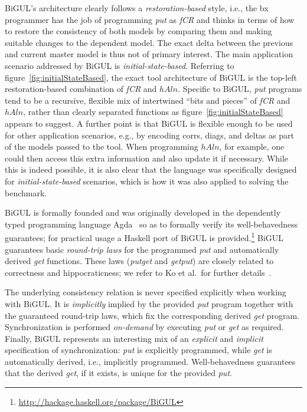 BiGUL's architecture clearly follows a \emph{restoration-based} style, i.e., the bx programmer has the job of programming \emph{put} as \emph{fCR}
and thinks in terms of how to restore the consistency of both models by comparing them and making suitable changes to the dependent model.
The exact delta between the previous and current master model is thus not of primary interest.
The main application scenario addressed by BiGUL is \emph{initial-state-based}.
Referring to figure~\ref{fig:initialStateBased}, the exact tool architecture of BiGUL is the top-left restoration-based combination of \emph{fCR} and $\mathit{hAln}$.
Specific to BiGUL, \emph{put} programs tend to be a recursive, flexible mix of intertwined ``bits and pieces'' of \emph{fCR} and $\mathit{hAln}$, rather than clearly separated functions as figure~\ref{fig:initialStateBased} appears to suggest.
A further point is that BiGUL is flexible enough to be used for other application scenarios, e.g., by encoding corrs, diags, and deltas as part of the models passed to the tool.
When programming $\mathit{hAln}$, for example, one could then access this extra information and also update it if necessary.
While this is indeed possible, it is also clear that the language was specifically designed for \emph{initial-state-based} scenarios, which is how it was also applied to solving the benchmark.

BiGUL is formally founded and was originally developed in the dependently typed programming language Agda~\cite{AFP08-Norell} so as to formally verify its well-behavedness guarantees; for practical usage a Haskell port of BiGUL is provided.\footnote{\url{http://hackage.haskell.org/package/BiGUL}}
BiGUL guarantees basic \emph{round-trip laws} for the programmed \emph{put} and automatically derived \emph{get} functions.
These laws (\emph{putget} and \emph{getput}) are closely related to correctness and hippocraticness; we refer to Ko et al.~for further details~\cite{PEPM2016-Ko}.

The underlying consistency relation is never specified explicitly when working with BiGUL.
It is \emph{implicitly} implied by the provided \emph{put} program together with the guaranteed round-trip laws, which fix the corresponding derived \emph{get} program.
Synchronization is performed \emph{on-demand} by executing \emph{put} or \emph{get} as required.
Finally, BiGUL represents an interesting mix of an \emph{explicit} and \emph{implicit} specification of synchronization:  \emph{put} is explicitly programmed, while \emph{get} is automatically derived, i.e., implicitly programmed.
Well-behavedness guarantees that the derived \emph{get}, if it exists, is unique for the provided \emph{put}.

